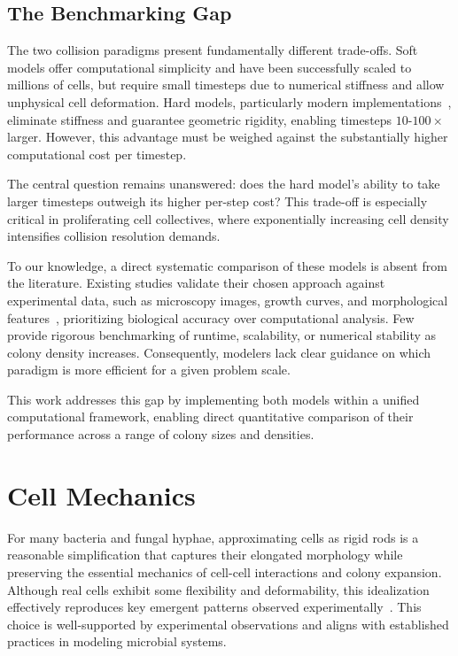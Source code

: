 \documentclass[conference]{IEEEtran}
\begin{document}
\subsection{The Benchmarking Gap}

The two collision paradigms present fundamentally different trade-offs. Soft models offer computational simplicity and have been successfully scaled to millions of cells, but require small timesteps due to numerical stiffness and allow unphysical cell deformation. Hard models, particularly modern implementations~\cite{Yan2019}, eliminate stiffness and guarantee geometric rigidity, enabling timesteps $10$-$100\times$ larger. However, this advantage must be weighed against the substantially higher computational cost per timestep.

The central question remains unanswered: does the hard model's ability to take larger timesteps outweigh its higher per-step cost? This trade-off is especially critical in proliferating cell collectives, where exponentially increasing cell density intensifies collision resolution demands.

To our knowledge, a direct systematic comparison of these models is absent from the literature. Existing studies validate their chosen approach against experimental data, such as microscopy images, growth curves, and morphological features~\cite{Rudge2012,Weady2024,Blanchard2015,Ghosh2015,You2018,Warren2019,Khan_2024,You_2021,Valdez2025,Rudge2013,Langeslay_2023}, prioritizing biological accuracy over computational analysis. Few provide rigorous benchmarking of runtime, scalability, or numerical stability as colony density increases. Consequently, modelers lack clear guidance on which paradigm is more efficient for a given problem scale.

This work addresses this gap by implementing both models within a unified computational framework, enabling direct quantitative comparison of their performance across a range of colony sizes and densities.

\section{Cell Mechanics}

For many bacteria and fungal hyphae, approximating cells as rigid rods is a reasonable simplification that captures their elongated morphology while preserving the essential mechanics of cell-cell interactions and colony expansion. Although real cells exhibit some flexibility and deformability, this idealization effectively reproduces key emergent patterns observed experimentally~\cite{Rudge2012,Khan_2024,Rudge2013,Langeslay_2023,Ghosh2015}. This choice is well-supported by experimental observations and aligns with established practices in modeling microbial systems.
\end{document}
